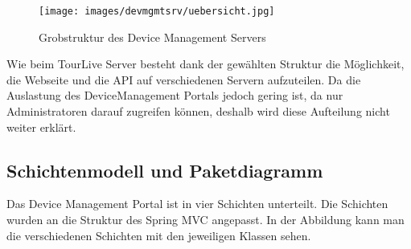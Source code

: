 \begin{figure}[H]
	\centering
	\texttt{[image: images/devmgmtsrv/uebersicht.jpg]}
	\caption{Grobstruktur des Device Management Servers}
\end{figure}

Wie beim TourLive Server besteht dank der gewählten Struktur die Möglichkeit, die Webseite und die API auf verschiedenen Servern aufzuteilen. Da die Auslastung des DeviceManagement Portals jedoch gering ist, da nur Administratoren darauf zugreifen können, deshalb wird diese Aufteilung nicht weiter erklärt.

\subsection{Schichtenmodell und Paketdiagramm}
Das Device Management Portal ist in vier Schichten unterteilt. Die Schichten wurden an die Struktur des Spring MVC angepasst. In der Abbildung kann man die verschiedenen Schichten mit den jeweiligen Klassen sehen.

